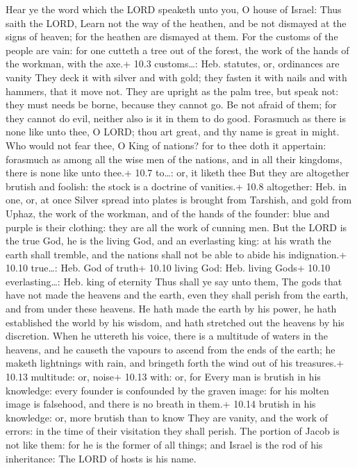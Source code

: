  Hear ye the word which the LORD speaketh unto you, O house
of Israel:  Thus saith the LORD, Learn not the way of the
heathen, and be not dismayed at the signs of heaven; for the heathen are
dismayed at them.  For the customs of the people are vain:
for one cutteth a tree out of the forest, the work of the hands of the
workman, with the axe.+ 10.3 customs\ldots: Heb. statutes, or,
ordinances are vanity  They deck it with silver and with
gold; they fasten it with nails and with hammers, that it move not.
 They are upright as the palm tree, but speak not: they must
needs be borne, because they cannot go. Be not afraid of them; for they
cannot do evil, neither also is it in them to do good. 
Forasmuch as there is none like unto thee, O LORD; thou art great, and
thy name is great in might.  Who would not fear thee, O King
of nations? for to thee doth it appertain: forasmuch as among all the
wise men of the nations, and in all their kingdoms, there is none like
unto thee.+ 10.7 to\ldots: or, it liketh thee  But they are
altogether brutish and foolish: the stock is a doctrine of vanities.+
10.8 altogether: Heb. in one, or, at once  Silver spread
into plates is brought from Tarshish, and gold from Uphaz, the work of
the workman, and of the hands of the founder: blue and purple is their
clothing: they are all the work of cunning men.  But the
LORD is the true God, he is the living God, and an everlasting king: at
his wrath the earth shall tremble, and the nations shall not be able to
abide his indignation.+ 10.10 true\ldots: Heb. God of truth+ 10.10
living God: Heb. living Gods+ 10.10 everlasting\ldots: Heb. king of
eternity  Thus shall ye say unto them, The gods that have
not made the heavens and the earth, even they shall perish from the
earth, and from under these heavens.  He hath made the
earth by his power, he hath established the world by his wisdom, and
hath stretched out the heavens by his discretion.  When he
uttereth his voice, there is a multitude of waters in the heavens, and
he causeth the vapours to ascend from the ends of the earth; he maketh
lightnings with rain, and bringeth forth the wind out of his treasures.+
10.13 multitude: or, noise+ 10.13 with: or, for  Every man
is brutish in his knowledge: every founder is confounded by the graven
image: for his molten image is falsehood, and there is no breath in
them.+ 10.14 brutish in his knowledge: or, more brutish than to know
 They are vanity, and the work of errors: in the time of
their visitation they shall perish.  The portion of Jacob
is not like them: for he is the former of all things; and Israel is the
rod of his inheritance: The LORD of hosts is his name.

